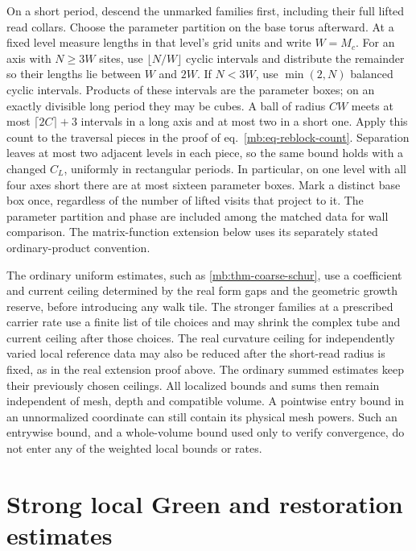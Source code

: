 \documentclass[11pt,letterpaper,reqno]{amsart}
\numberwithin{equation}{section}
\renewcommand{\eqref}[1]{\textup{eq.~\ref{#1}}}
\theoremstyle{definition}
\theoremstyle{remark}
\begin{document}
On a short period, descend the unmarked families first, including their full lifted read collars. Choose the parameter partition on the base torus afterward. At a fixed level measure lengths in that level's grid units and write \(W=M_c\). For an axis with \(N\ge3W\) sites, use \(\lfloor N/W\rfloor\) cyclic intervals and distribute the remainder so their lengths lie between \(W\) and \(2W\). If \(N<3W\), use \(\min(2,N)\) balanced cyclic intervals. Products of these intervals are the parameter boxes; on an exactly divisible long period they may be cubes. A ball of radius \(CW\) meets at most \(\lceil2C\rceil+3\) intervals in a long axis and at most two in a short one. Apply this count to the traversal pieces in the proof of \eqref{mb:eq-reblock-count}. Separation leaves at most two adjacent levels in each piece, so the same bound holds with a changed \(C_L\), uniformly in rectangular periods. In particular, on one level with all four axes short there are at most sixteen parameter boxes. Mark a distinct base box once, regardless of the number of lifted visits that project to it. The parameter partition and phase are included among the matched data for wall comparison. The matrix-function extension below uses its separately stated ordinary-product convention.

The ordinary uniform estimates, such as \cref{mb:thm-coarse-schur}, use a coefficient and current ceiling determined by the real form gaps and the geometric growth reserve, before introducing any walk tile. The stronger families at a prescribed carrier rate use a finite list of tile choices and may shrink the complex tube and current ceiling after those choices. The real curvature ceiling for independently varied local reference data may also be reduced after the short-read radius is fixed, as in the real extension proof above. The ordinary summed estimates keep their previously chosen ceilings. All localized bounds and sums then remain independent of mesh, depth and compatible volume. A pointwise entry bound in an unnormalized coordinate can still contain its physical mesh powers. Such an entrywise bound, and a whole-volume bound used only to verify convergence, do not enter any of the weighted local bounds or rates.


\section{Strong local Green and restoration estimates}
\label{mb:sec-strong-green}
\end{document}
